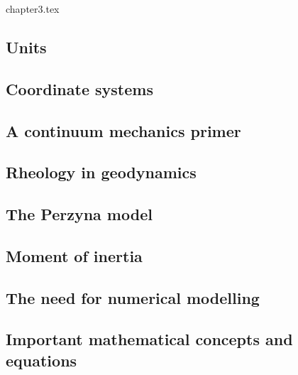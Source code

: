 \begin{flushright} {\tiny {\color{gray} chapter3.tex}} \end{flushright}

\subsection{Units}  %
\subsection{Coordinate systems}  \label{ss:coordsys} %
\subsection{A continuum mechanics primer} %
\newpage
\subsection{Rheology in geodynamics}  %


\newpage
\subsection{The Perzyna model}\label{sec:perzyna}


\newpage
\subsection{Moment of inertia}  %
\subsection{The need for numerical modelling} %
\newpage
\subsection{Important mathematical concepts and equations}  \label{ss:maths} %
